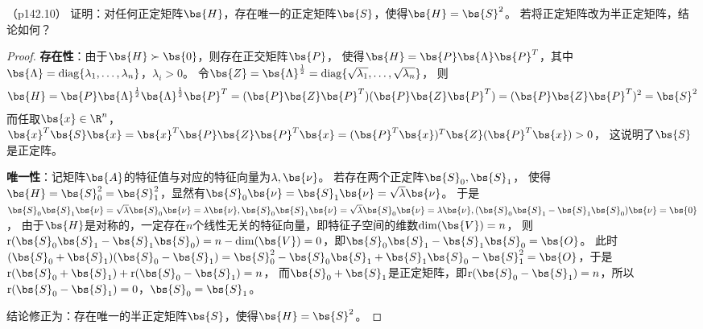 \documentclass[12pt, a4paper, oneside, UTF8]{ctexbook}
\begin{document}
\begin{question}（p142.10）
    证明：对任何正定矩阵$\bs{H}$，存在唯一的正定矩阵$\bs{S}$，使得$\bs{H}=\bs{S}^2$。
    若将正定矩阵改为半正定矩阵，结论如何？
\end{question}

\begin{proof}
    \textbf{存在性}：由于$\bs{H} \succ \bs{0}$，则存在正交矩阵$\bs{P}$，
    使得$\bs{H}=\bs{P}\bs{\Lambda}\bs{P}^T$，其中$\bs{\Lambda}
    =\mathrm{diag}\{\lambda_1,\ldots,\lambda_n\}$，$\lambda_i > 0$。
    令$\bs{Z}=\bs{\Lambda}^{\frac{1}{2}}=\mathrm{diag}\{\sqrt{\lambda_1},\ldots,\sqrt{\lambda_n}\}$，
    则
    \begin{align*}
        \bs{H}=\bs{P}\bs{\Lambda}^{\frac{1}{2}}\bs{\Lambda}^{\frac{1}{2}}\bs{P}^T=(\bs{P}\bs{Z}\bs{P}^T)(\bs{P}\bs{Z}\bs{P}^T)
        =(\bs{P}\bs{Z}\bs{P}^T)^2=\bs{S}^2
    \end{align*}
    而任取$\bs{x}\in \R^n$，$\bs{x}^T\bs{S}\bs{x}=
    \bs{x}^T\bs{P}\bs{Z}\bs{P}^T\bs{x}=
    (\bs{P}^T\bs{x})^T\bs{Z}(\bs{P}^T\bs{x}) >0$，
    这说明了$\bs{S}$是正定阵。

    \textbf{唯一性}：记矩阵$\bs{A}$的特征值与对应的特征向量为$\lambda,\bs{\nu}$。
    若存在两个正定阵$\bs{S}_0,\bs{S}_1$，
    使得$\bs{H}=\bs{S}_0^2=\bs{S}_1^2$，显然有$\bs{S}_0\bs{\nu}=\bs{S}_1\bs{\nu}=\sqrt{\lambda}\bs{\nu}$。
    于是$\bs{S}_0\bs{S}_1\bs{\nu}=\sqrt{\lambda}\bs{S}_0\bs{\nu}=\lambda \bs{\nu},
    \bs{S}_0\bs{S}_1\bs{\nu}=\sqrt{\lambda}\bs{S}_0\bs{\nu}=\lambda \bs{\nu},
    (\bs{S}_0\bs{S}_1-\bs{S}_1\bs{S}_0)\bs{\nu}=\bs{0}$，
    由于$\bs{H}$是对称的，一定存在$n$个线性无关的特征向量，即特征子空间的维数$\mathrm{dim}(\bs{V})=n$，
    则$\mathrm{r}(\bs{S}_0\bs{S}_1-\bs{S}_1\bs{S}_0)=n-\mathrm{dim}(\bs{V})=0$，即$\bs{S}_0\bs{S}_1-\bs{S}_1\bs{S}_0=\bs{O}$。
    此时$(\bs{S}_0+\bs{S}_1)(\bs{S}_0-\bs{S}_1)=\bs{S}_0^2-\bs{S}_0\bs{S}_1+\bs{S}_1\bs{S}_0-\bs{S}_1^2=\bs{O}$，于是$\mathrm{r}(\bs{S}_0+\bs{S}_1)+\mathrm{r}(\bs{S}_0-\bs{S}_1)=n$，
    而$\bs{S}_0+\bs{S}_1$是正定矩阵，即$\mathrm{r}(\bs{S}_0-\bs{S}_1)=n$，所以$\mathrm{r}(\bs{S}_0-\bs{S}_1)=0$，$\bs{S}_0=\bs{S}_1$。
    
    结论修正为：存在唯一的半正定矩阵$\bs{S}$，使得$\bs{H}=\bs{S}^2$。
    
\end{proof}







\ifx\allfiles\undefined
\end{document}
